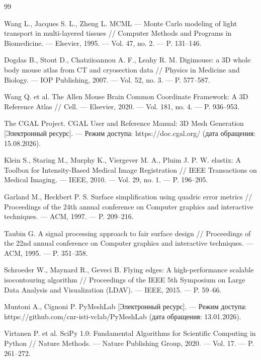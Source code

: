\documentclass[a4paper,14pt]{article}
\begin{document}
\newpage
\renewcommand{\refname}{Список литературы}
\begin{thebibliography}{99}

Wang L., Jacques S. L., Zheng L. MCML --- Monte Carlo modeling of light transport in multi-layered tissues // Computer Methods and Programs in Biomedicine. --- Elsevier, 1995. --- Vol. 47, no. 2. --- P. 131--146.

Dogdas B., Stout D., Chatziioannou A. F., Leahy R. M. Digimouse: a 3D whole body mouse atlas from CT and cryosection data // Physics in Medicine and Biology. --- IOP Publishing, 2007. --- Vol. 52, no. 3. --- P. 577--587.

Wang Q. et al. The Allen Mouse Brain Common Coordinate Framework: A 3D Reference Atlas // Cell. --- Elsevier, 2020. --- Vol. 181, no. 4. --- P. 936--953.

The CGAL Project. CGAL User and Reference Manual: 3D Mesh Generation [Электронный ресурс]. --- Режим доступа: https://doc.cgal.org/ (дата обращения: 15.08.2026).

Klein S., Staring M., Murphy K., Viergever M. A., Pluim J. P. W. elastix: A Toolbox for Intensity-Based Medical Image Registration // IEEE Transactions on Medical Imaging. --- IEEE, 2010. --- Vol. 29, no. 1. --- P. 196--205.

Garland M., Heckbert P. S. Surface simplification using quadric error metrics // Proceedings of the 24th annual conference on Computer graphics and interactive techniques. --- ACM, 1997. --- P. 209--216.

Taubin G. A signal processing approach to fair surface design // Proceedings of the 22nd annual conference on Computer graphics and interactive techniques. --- ACM, 1995. --- P. 351--358.

Schroeder W., Maynard R., Geveci B. Flying edges: A high-performance scalable isocontouring algorithm // Proceedings of the IEEE 5th Symposium on Large Data Analysis and Visualization (LDAV). --- IEEE, 2015. --- P. 59--66.

Muntoni A., Cignoni P. PyMeshLab [Электронный ресурс]. --- Режим доступа: https://github.com/cnr-isti-vclab/PyMeshLab (дата обращения: 13.01.2026).

Virtanen P. et al. SciPy 1.0: Fundamental Algorithms for Scientific Computing in Python // Nature Methods. --- Nature Publishing Group, 2020. --- Vol. 17. --- P. 261--272.

\end{thebibliography}
\end{document}
